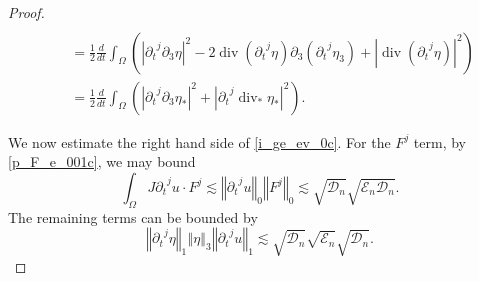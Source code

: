 \documentclass[a4paper,reqno,11pt]{amsart}
\numberwithin{equation}{section}
\providecommand{\abs}[1]{\left\vert#1\right\vert}
\providecommand{\norm}[1]{\left\Vert#1\right\Vert}
\providecommand{\sd}[1]{\mathcal{D}_{#1}}
\providecommand{\se}[1]{\mathcal{E}_{#1}}
\providecommand{\norm}[1]{\left\Vert#1\right\Vert}
\begin{document}
\begin{proof}
\begin{equation}
\begin{split}
\\&\quad={\frac{1}{2}}{ \frac{d}{dt}} \int_\Omega
 \left( \abs{{\partial_t}^j {\partial}_3\eta}^2 -2\operatorname{div} ({\partial_t}^j \eta) {\partial}_3({\partial_t}^j \eta_3)+ \abs{\operatorname{div} ({\partial_t}^j \eta)}^2\right)
\\&\quad={\frac{1}{2}}{ \frac{d}{dt}} \int_\Omega
 \left( \abs{{\partial_t}^j {\partial}_3\eta_\ast}^2  + \abs{{\partial_t}^j \operatorname{div}_\ast  \eta_\ast}^2\right).
\end{split}
\end{equation}

We now estimate the right hand side of \eqref{i_ge_ev_0c}. For the $F^{j}$ term, by \eqref{p_F_e_001c}, we may bound
\begin{equation}
\int_\Omega  J{\partial_t}^j u\cdot F^{j} {\lesssim}   \norm{{\partial_t}^j u}_{0}   \norm{F^{j}}_0 {\lesssim}  \sqrt{\sd{n} } \sqrt{\se{n} \sd{n}}
 .
\end{equation}
The remaining terms can be bounded by
\begin{equation}\label{i_te_5c}
 \norm{{\partial_t}^j \eta}_{1}  \norm{ \eta}_{3} \norm{ {\partial_t}^ju }_{1}{\lesssim}   \sqrt{\sd{n} } \sqrt{\se{n} } \sqrt{\sd{n} }  .
\end{equation}


\end{proof}
\end{document}
